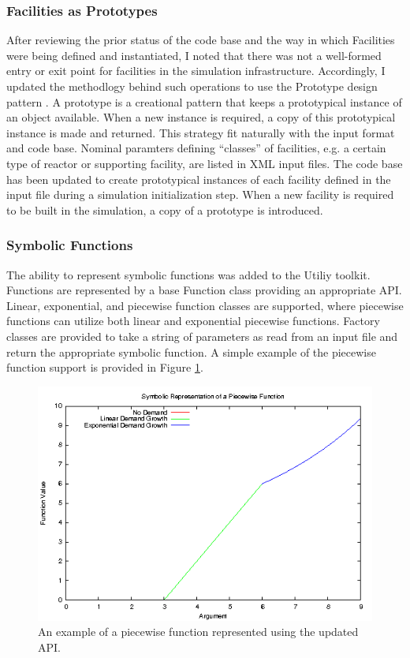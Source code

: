 \subsubsection{Facilities as Prototypes}
After reviewing the prior status of the code base and the way in which
Facilities were being defined and instantiated, I noted that there was not a
well-formed entry or exit point for facilities in the simulation
infrastructure. Accordingly, I updated the methodlogy behind such operations to
use the Prototype design pattern \cite{vlissides_design_1995}. A prototype is a
creational pattern that keeps a prototypical instance of an object
available. When a new instance is required, a copy of this prototypical instance
is made and returned. This strategy fit naturally with the \Cyclus input format
and code base. Nominal paramters defining ``classes'' of facilities, e.g. a
certain type of reactor or supporting facility, are listed in XML input
files. The code base has been updated to create prototypical instances of each
facility defined in the input file during a simulation initialization step. When
a new facility is required to be built in the simulation, a copy of a prototype
is introduced.

\subsubsection{Symbolic Functions}

The ability to represent symbolic functions was added to the \Cyclus Utiliy
toolkit. Functions are represented by a base Function class providing an
appropriate API. Linear, exponential, and piecewise function classes are
supported, where piecewise functions can utilize both linear and exponential
piecewise functions. Factory classes are provided to take a string of parameters
as read from an input file and return the appropriate symbolic function. A
simple example of the piecewise function support is provided in Figure
\ref{fig:piecewise}.

\begin{figure}[H]
  \begin{center}
    \includegraphics[width=\linewidth]{./chapters/prevwork/piecewise.png}
  \caption{An example of a piecewise function represented using the updated API.}
  \label{fig:piecewise}
  \end{center}
\end{figure}

